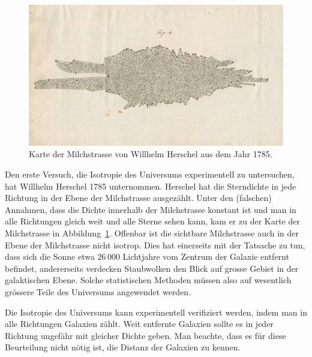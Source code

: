 \begin{figure}
\centering
\includegraphics[width=\hsize]{chapters/images/rs-9810.jpg}
\caption{Karte der Milchstrasse von Willhelm Herschel aus dem Jahr 1785.
\label{skript:robertson:herschel}}
\end{figure}
Den erste Versuch, die Isotropie des Universums experimentell zu untersuchen,
hat Willhelm Herschel 1785 unternommen.
Herschel hat die Sterndichte in jede Richtung in der Ebene der Milchstrasse
ausgezählt.
Unter den (falschen) Annahmen, dass die Dichte innerhalb der Milchstrasse
konstant ist und man in alle Richtungen gleich weit und alle Sterne sehen
kann, kam er zu der Karte der Milchstrasse in
Abbildung~\ref{skript:robertson:herschel}.
Offenbar ist die sichtbare Milchstrasse auch in der Ebene der Milchstrasse
nicht isotrop.
Dies hat einerseits mit der Tatsache zu tun, dass sich die Sonne etwa
$26\,000$ Lichtjahre vom Zentrum der Galaxie entfernt befindet, andererseits
verdecken Staubwolken den Blick auf grosse Gebiet in der galaktischen Ebene.
Solche statistischen Methoden müssen also auf wesentlich grössere Teile
des Universums angewendet werden.

Die Isotropie des Universums kann experimentell verifiziert werden,
indem man in alle Richtungen Galaxien zählt.
Weit entfernte Galaxien sollte es in jeder Richtung ungefähr mit 
gleicher Dichte geben.
Man beachte, dass es für diese Beurteilung nicht nötig ist, die
Distanz der Galaxien zu kennen.

